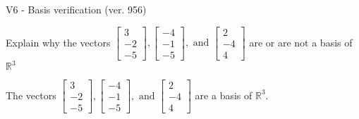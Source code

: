 \begin{exercise}
  \begin{exerciseTitle}V6 - Basis verification (ver. 956)\end{exerciseTitle}
  \begin{exerciseStatement}
    Explain why the vectors \(\left[\begin{array}{r}
3 \\
-2 \\
-5
\end{array}\right] , \left[\begin{array}{r}
-4 \\
-1 \\
-5
\end{array}\right] , \text{ and } \left[\begin{array}{r}
2 \\
-4 \\
4
\end{array}\right]\) are or are not a basis of \(\mathbb{R}^3\)	


  \end{exerciseStatement}
  \begin{exerciseAnswer}
   The vectors \(\left[\begin{array}{r}
3 \\
-2 \\
-5
\end{array}\right] , \left[\begin{array}{r}
-4 \\
-1 \\
-5
\end{array}\right] , \text{ and } \left[\begin{array}{r}
2 \\
-4 \\
4
\end{array}\right]\) 
  	 are  a basis of \(\mathbb{R}^3\).
  


  \end{exerciseAnswer}
\end{exercise}